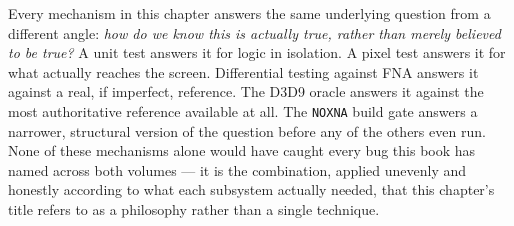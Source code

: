 Every mechanism in this chapter answers the same underlying question from a different angle:
\emph{how do we know this is actually true, rather than merely believed to be true?} A unit
test answers it for logic in isolation. A pixel test answers it for what actually reaches the
screen. Differential testing against FNA answers it against a real, if imperfect, reference.
The D3D9 oracle answers it against the most authoritative reference available at all. The
\texttt{NOXNA} build gate answers a narrower, structural version of the question before any
of the others even run. None of these mechanisms alone would have caught every bug this book
has named across both volumes --- it is the combination, applied unevenly and honestly
according to what each subsystem actually needed, that this chapter's title refers to as a
philosophy rather than a single technique.
